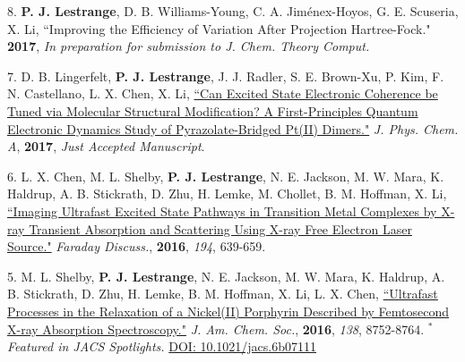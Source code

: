 


\begin{cvpublications}

\cvpublication
{8.} 
{\textbf{P. J. Lestrange}, D. B. Williams-Young, C. A. Jim\'enex-Hoyos, G. E. Scuseria, X. Li, ``Improving the Efficiency of Variation After Projection Hartree-Fock." \textbf{2017}, \textit{In preparation for submission to J. Chem. Theory Comput.}} 


\cvpublication
{7.} 
{D. B. Lingerfelt, \textbf{P. J. Lestrange}, J. J. Radler, S. E. Brown-Xu, P. Kim, F. N. Castellano, L. X. Chen, X. Li, \href{http://pubs.acs.org/doi/abs/10.1021/acs.jpca.6b12099}{``Can Excited State Electronic Coherence be Tuned via Molecular Structural Modification? A First-Principles Quantum Electronic Dynamics Study of Pyrazolate-Bridged Pt(II) Dimers."} \textit{J. Phys. Chem. A}, \textbf{2017}, \textit{Just Accepted Manuscript}.} 


\cvpublication
{6.} 
{L. X. Chen, M. L. Shelby, \textbf{P. J. Lestrange}, N. E. Jackson, M. W. Mara, K. Haldrup, A. B. Stickrath, D. Zhu, H. Lemke, M. Chollet, B. M. Hoffman, X. Li,  \href{http://pubs.rsc.org/en/Content/ArticleLanding/2016/FD/C6FD00083E}{``Imaging Ultrafast Excited State Pathways in Transition Metal Complexes by X-ray Transient Absorption and Scattering Using X-ray Free Electron Laser Source."} \textit{Faraday Discuss.}, \textbf{2016}, \textit{194}, 639-659.} 


\cvpublication
{5.} 
{M. L. Shelby, \textbf{P. J. Lestrange}, N. E. Jackson, M. W. Mara, K. Haldrup, A. B. Stickrath, D. Zhu, H. Lemke, B. M. Hoffman, X. Li, L. X. Chen, \href{http://pubs.acs.org/doi/abs/10.1021/jacs.6b02176}{``Ultrafast Processes in the Relaxation of a Nickel(II) Porphyrin Described by Femtosecond X-ray Absorption Spectroscopy."} \textit{J. Am. Chem. Soc.}, \textbf{2016}, \textit{138}, 8752-8764. $^*$\textit{Featured in JACS Spotlights.} \href{http://pubs.acs.org/doi/abs/10.1021/jacs.6b07111}{DOI: 10.1021/jacs.6b07111}} 


\end{cvpublications}
